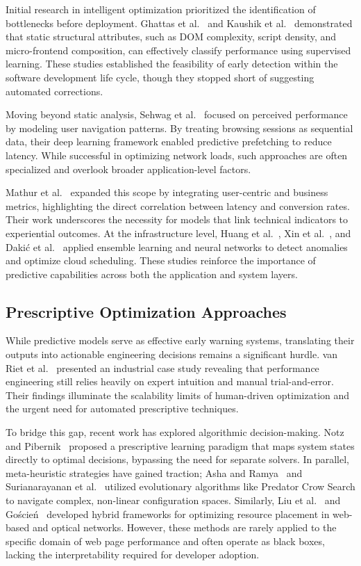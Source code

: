 \documentclass[sn-nature]{sn-jnl}
\begin{document}
Initial research in intelligent optimization prioritized the identification of bottlenecks before deployment. Ghattas et al.~\cite{ghattas2025} and Kaushik et al.~\cite{kaushik2024} demonstrated that static structural attributes, such as DOM complexity, script density, and micro-frontend composition, can effectively classify performance using supervised learning. These studies established the feasibility of early detection within the software development life cycle, though they stopped short of suggesting automated corrections.

Moving beyond static analysis, Sehwag et al.~\cite{sehwag2024} focused on perceived performance by modeling user navigation patterns. By treating browsing sessions as sequential data, their deep learning framework enabled predictive prefetching to reduce latency. While successful in optimizing network loads, such approaches are often specialized and overlook broader application-level factors.

Mathur et al.~\cite{mathur2024} expanded this scope by integrating user-centric and business metrics, highlighting the direct correlation between latency and conversion rates. Their work underscores the necessity for models that link technical indicators to experiential outcomes. At the infrastructure level, Huang et al.~\cite{huang2023}, Xin et al.~\cite{xin2023}, and Daki\'{c} et al.~\cite{dakic2025} applied ensemble learning and neural networks to detect anomalies and optimize cloud scheduling. These studies reinforce the importance of predictive capabilities across both the application and system layers.

\subsection{Prescriptive Optimization Approaches}

While predictive models serve as effective early warning systems, translating their outputs into actionable engineering decisions remains a significant hurdle. van Riet et al.~\cite{vanriet2023} presented an industrial case study revealing that performance engineering still relies heavily on expert intuition and manual trial-and-error. Their findings illuminate the scalability limits of human-driven optimization and the urgent need for automated prescriptive techniques.

To bridge this gap, recent work has explored algorithmic decision-making. Notz and Pibernik~\cite{notz2024} proposed a prescriptive learning paradigm that maps system states directly to optimal decisions, bypassing the need for separate solvers. In parallel, meta-heuristic strategies have gained traction; Asha and Ramya~\cite{asha2025} and Surianarayanan et al.~\cite{surianarayanan2023} utilized evolutionary algorithms like Predator Crow Search to navigate complex, non-linear configuration spaces. Similarly, Liu et al.~\cite{liu2023} and Goścień~\cite{goscien2025} developed hybrid frameworks for optimizing resource placement in web-based and optical networks. However, these methods are rarely applied to the specific domain of web page performance and often operate as black boxes, lacking the interpretability required for developer adoption.
\end{document}
